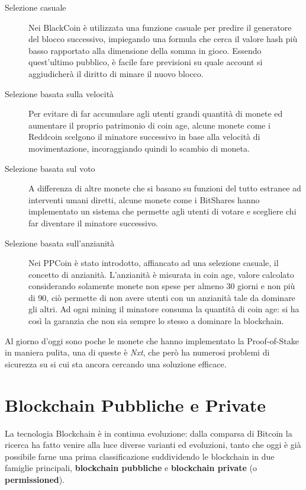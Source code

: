 \begin{description}
  \item[Selezione casuale] Nei BlackCoin è utilizzata una funzione casuale per predire il generatore del blocco successivo, impiegando una formula che cerca il valore hash più basso rapportato alla dimensione della somma in gioco. Essendo quest'ultimo pubblico, è facile fare previsioni su quale account si aggiudicherà il diritto di minare il nuovo blocco.
  \item[Selezione basata sulla velocità] Per evitare di far accumulare agli utenti grandi quantità di monete ed aumentare il proprio patrimonio di coin age, alcune monete come i Reddcoin scelgono il minatore successivo in base alla velocità di movimentazione, incoraggiando quindi lo scambio di moneta.
  \item[Selezione basata sul voto] A differenza di altre monete che si basano su funzioni del tutto estranee ad interventi umani diretti, alcune monete come i BitShares hanno implementato un sistema che permette agli utenti di votare e scegliere chi far diventare il minatore successivo.
  \item[Selezione basata sull'anzianità] Nei PPCoin è stato introdotto, affiancato ad una selezione casuale, il concetto di anzianità. L'anzianità è misurata in coin age, valore calcolato considerando solamente monete non spese per almeno 30 giorni e non più di 90, ciò permette di non avere utenti con un anzianità tale da dominare gli altri. Ad ogni mining il minatore consuma la quantità di coin age: si ha così la garanzia che non sia sempre lo stesso a dominare la blockchain.
\end{description}

Al giorno d'oggi sono poche le monete che hanno implementato la Proof-of-Stake in maniera pulita, una di queste è \textit{Nxt}, che però ha numerosi problemi di sicurezza su si cui sta ancora cercando una soluzione efficace.

\section{Blockchain Pubbliche e Private}
La tecnologia Blockchain è in continua evoluzione: dalla comparsa di Bitcoin la ricerca ha fatto venire alla luce diverse varianti ed evoluzioni, tanto che oggi è già possibile farne una prima classificazione suddividendo le blockchain in due famiglie principali, \textbf{blockchain pubbliche} e \textbf{blockchain private} (o \textbf{permissioned}).

